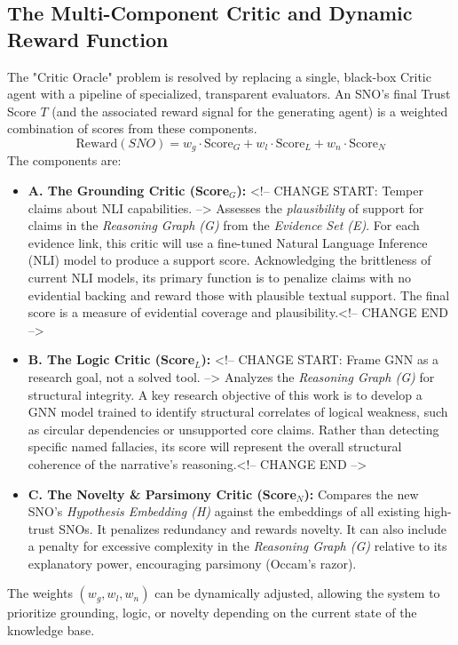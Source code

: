 \documentclass[12pt, a4paper]{article}
\begin{document}
\subsection{The Multi-Component Critic and Dynamic Reward Function}
The "Critic Oracle" problem is resolved by replacing a single, black-box Critic agent with a pipeline of specialized, transparent evaluators. An SNO's final Trust Score $T$ (and the associated reward signal for the generating agent) is a weighted combination of scores from these components.
\begin{equation}
\text{Reward}(SNO) = w_g \cdot \text{Score}_G + w_l \cdot \text{Score}_L + w_n \cdot \text{Score}_N
\end{equation}
The components are:
\begin{itemize}
    \item \textbf{A. The Grounding Critic (Score$_G$):} <!-- CHANGE START: Temper claims about NLI capabilities. --> Assesses the \textit{plausibility} of support for claims in the \textit{Reasoning Graph (G)} from the \textit{Evidence Set (E)}. For each evidence link, this critic will use a fine-tuned Natural Language Inference (NLI) model to produce a support score. Acknowledging the brittleness of current NLI models, its primary function is to penalize claims with no evidential backing and reward those with plausible textual support. The final score is a measure of evidential coverage and plausibility.<!-- CHANGE END -->
    \item \textbf{B. The Logic Critic (Score$_L$):} <!-- CHANGE START: Frame GNN as a research goal, not a solved tool. --> Analyzes the \textit{Reasoning Graph (G)} for structural integrity. A key research objective of this work is to develop a GNN model trained to identify structural correlates of logical weakness, such as circular dependencies or unsupported core claims. Rather than detecting specific named fallacies, its score will represent the overall structural coherence of the narrative's reasoning.<!-- CHANGE END -->
    \item \textbf{C. The Novelty \& Parsimony Critic (Score$_N$):} Compares the new SNO's \textit{Hypothesis Embedding (H)} against the embeddings of all existing high-trust SNOs. It penalizes redundancy and rewards novelty. It can also include a penalty for excessive complexity in the \textit{Reasoning Graph (G)} relative to its explanatory power, encouraging parsimony (Occam's razor).
\end{itemize}
The weights $(w_g, w_l, w_n)$ can be dynamically adjusted, allowing the system to prioritize grounding, logic, or novelty depending on the current state of the knowledge base.
\end{document}
